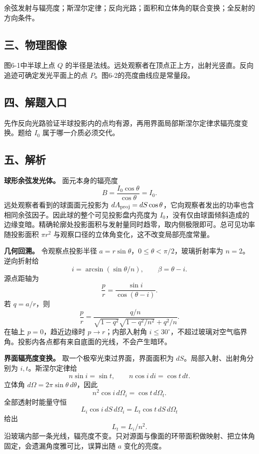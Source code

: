 \documentclass[12pt,a4paper,UTF8]{ctexart}
\begin{document}
余弦发射与辐亮度；斯涅尔定律；反向光路；面积和立体角的联合变换；全反射的方向条件。

\subsection{三、物理图像}\label{ux4e09ux7269ux7406ux56feux50cf-5}

图6-1中半球上点 \(Q\)
的半径是法线。远处观察者在顶点正上方，出射光竖直。反向追迹可确定发光平面上的点
\(P\)。图6-2的亮度曲线应是常量段。

\subsection{四、解题入口}\label{ux56dbux89e3ux9898ux5165ux53e3-5}

先作反向光路验证半球投影内的点均有源，再用界面局部斯涅尔定律求辐亮度变换。题给
\(I_0\) 属于哪一介质必须交代。

\subsection{五、解析}\label{ux4e94ux89e3ux6790-5}

\textbf{球形余弦发光体。} 面元本身的辐亮度 \[
B=\frac{I_0\cos\theta}{\cos\theta}=I_0.
\] 远处观察者看到的球面面元投影为
\(dA_{\rm proj}=dS\cos\theta\)，它向观察者发出的功率也含相同余弦因子。因此球的整个可见投影盘内亮度为
\(I_0\)，没有仅由球面倾斜造成的边缘变暗。精确轮廓处投影面积与发射量同时趋零，取内侧极限即可。总可见功率随投影面积
\(\pi r^2\) 与观察口径的立体角变化，这不改变局部亮度常量。

\textbf{几何回溯。} 令观察点投影半径
\(a=r\sin\theta\)，\(0\le\theta<\pi/2\)，玻璃折射率为
\(n=2\)。逆向折射给 \[
i=\arcsin(\sin\theta/n),\qquad
\beta=\theta-i.
\] 源点距轴为 \[
\frac pr=\frac{\sin i}{\cos(\theta-i)}.
\] 若 \(q=a/r\)，则 \[
\frac pr=\frac{q/n}
{\sqrt{1-q^2}\sqrt{1-q^2/n^2}+q^2/n}.
\] 在轴上 \(p=0\)，趋近边缘时 \(p\to r\)；内部入射角
\(i\le30^\circ\)，不超过玻璃对空气临界角。投影内各点都有来自底面的光线，不会产生暗环。

\textbf{界面辐亮度变换。} 取一个极窄光束过界面，界面面积为
\(dS\)。局部入射、出射角分别为 \(i,t\)。斯涅尔定律给 \[
n\sin i=\sin t,\qquad
n\cos i\,di=\cos t\,dt.
\] 立体角 \(d\Omega=2\pi\sin\theta\,d\theta\)，因此 \[
n^2\cos i\,d\Omega_i=\cos t\,d\Omega_t.
\] 全部透射时能量守恒 \[
L_i\cos i\,dS\,d\Omega_i
=L_t\cos t\,dS\,d\Omega_t
\] 给出 \[
\boxed{L_t=L_i/n^2}.
\]
沿玻璃内部一条光线，辐亮度不变。只对源面与像面的环带面积做映射、把立体角固定，会遗漏角度雅可比，误算出随
\(a\) 变化的亮度。
\end{document}
